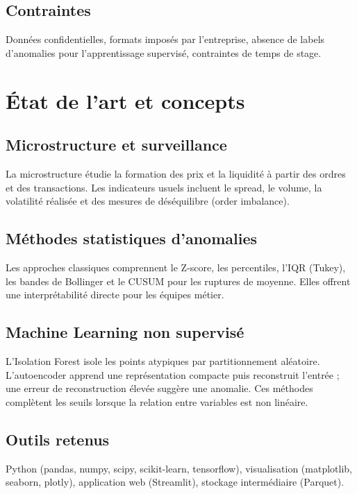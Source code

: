 \documentclass[a4paper,12pt,twoside,openright]{report}
\begin{document}
\section{Contraintes}
Données confidentielles, formats imposés par l'entreprise, absence de labels d'anomalies pour l'apprentissage supervisé, contraintes de temps de stage.

\chapter{État de l'art et concepts}
\label{chap:etat_art}

\section{Microstructure et surveillance}
La microstructure étudie la formation des prix et la liquidité à partir des ordres et des transactions. Les indicateurs usuels incluent le spread, le volume, la volatilité réalisée et des mesures de déséquilibre (order imbalance).

\section{Méthodes statistiques d'anomalies}
Les approches classiques comprennent le Z-score, les percentiles, l'IQR (Tukey), les bandes de Bollinger et le CUSUM pour les ruptures de moyenne. Elles offrent une interprétabilité directe pour les équipes métier.

\section{Machine Learning non supervisé}
L'Isolation Forest isole les points atypiques par partitionnement aléatoire. L'autoencoder apprend une représentation compacte puis reconstruit l'entrée ; une erreur de reconstruction élevée suggère une anomalie. Ces méthodes complètent les seuils lorsque la relation entre variables est non linéaire.

\section{Outils retenus}
Python (pandas, numpy, scipy, scikit-learn, tensorflow), visualisation (matplotlib, seaborn, plotly), application web (Streamlit), stockage intermédiaire (Parquet).

\end{document}
